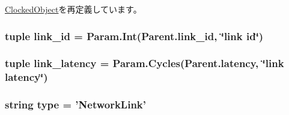 \hyperlink{classClockedObject_1_1ClockedObject_a17da7064bc5c518791f0c891eff05fda}{ClockedObject}を再定義しています。\hypertarget{classGarnetLink_1_1NetworkLink_a68ad93ab49e865b9e80829c3ee7130c7}{
\subsubsection[{link\_\-id}]{\setlength{\rightskip}{0pt plus 5cm}tuple {\bf link\_\-id} = Param.Int(Parent.link\_\-id, \char`\"{}link id\char`\"{})}}
\label{classGarnetLink_1_1NetworkLink_a68ad93ab49e865b9e80829c3ee7130c7}
\hypertarget{classGarnetLink_1_1NetworkLink_aee092f519cc5d61dc0287dff3edd11ab}{
\subsubsection[{link\_\-latency}]{\setlength{\rightskip}{0pt plus 5cm}tuple {\bf link\_\-latency} = Param.Cycles(Parent.latency, \char`\"{}link latency\char`\"{})}}
\label{classGarnetLink_1_1NetworkLink_aee092f519cc5d61dc0287dff3edd11ab}
\hypertarget{classGarnetLink_1_1NetworkLink_acce15679d830831b0bbe8ebc2a60b2ca}{
\subsubsection[{type}]{\setlength{\rightskip}{0pt plus 5cm}string {\bf type} = '{\bf NetworkLink}'}}
\label{classGarnetLink_1_1NetworkLink_acce15679d830831b0bbe8ebc2a60b2ca}



